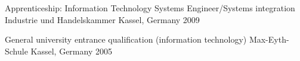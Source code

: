

\begin{cventries}

  \cventry
    {Apprenticeship: Information Technology Systems Engineer/Systems integration} %
    {Industrie und Handelskammer} %
    {Kassel, Germany} %
    {2009} %
    {}

  \cventry
    {General university entrance qualification (information technology)} %
    {Max-Eyth-Schule} %
    {Kassel, Germany} %
    {2005} %
    {}

\end{cventries}
